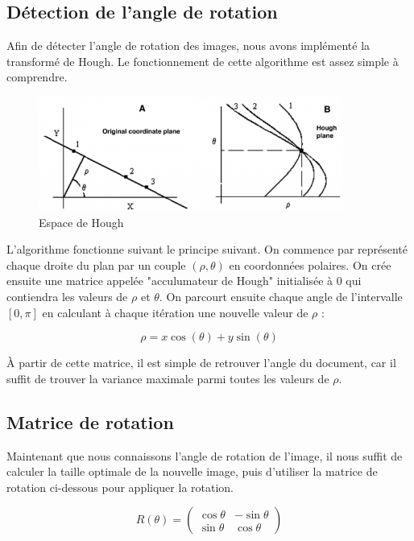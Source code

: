 \documentclass[11pt]{report}
\begin{document}
\subsection{Détection de l'angle de rotation}

Afin de détecter l'angle de rotation des images, nous avons implémenté la transformé de Hough. Le fonctionnement de cette algorithme est assez simple à comprendre.

\begin{figure}[htbp]
\centering
\includegraphics[width=10cm]{hough.jpg}
\caption{Espace de Hough}
\end{figure}

L'algorithme fonctionne suivant le principe suivant. On commence par représenté chaque droite du plan par un couple $(\rho, \theta)$ en coordonnées polaires. On crée ensuite une matrice appelée "acculumateur de Hough" initialisée à 0 qui contiendra les valeurs de $\rho$ et $\theta$. On parcourt ensuite chaque angle de l’intervalle $[0, \pi]$ en calculant à chaque itération une nouvelle valeur de $\rho$ :

\[ \rho = x\cos \left( \theta \right) + y\sin \left( \theta \right) \]

À partir de cette matrice, il est simple de retrouver l'angle du document, car il suffit de trouver la variance maximale parmi toutes les valeurs de $\rho$.

\subsection{Matrice de rotation}

Maintenant que nous connaissons l'angle de rotation de l'image, il nous suffit de calculer la taille optimale de la nouvelle image, puis d'utiliser la matrice de rotation ci-dessous pour appliquer la rotation.

\[ R \left( \theta \right) = \begin{pmatrix}
   \cos \theta & - \sin \theta \\
   \sin \theta & \cos \theta 
\end{pmatrix} \]
\end{document}
